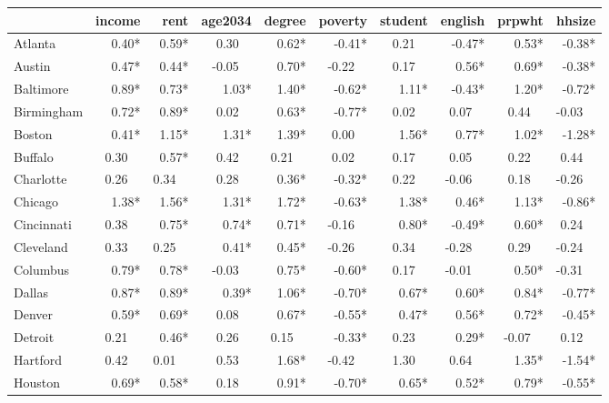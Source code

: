 \fontsize{9.5}{11.1}\selectfont
\begin{tabular}{lrrrrrrrrr}
	\toprule
	{}             &  income &    rent & age2034 &  degree & poverty & student & english &  prpwht &  hhsize \\ \midrule
	Atlanta        &   0.40* &   0.59* &  0.30~~ &   0.62* &  -0.41* &  0.21~~ &  -0.47* &   0.53* &  -0.38* \\
	Austin         &   0.47* &   0.44* & -0.05~~ &   0.70* & -0.22~~ &  0.17~~ &   0.56* &   0.69* &  -0.38* \\
	Baltimore      &   0.89* &   0.73* &   1.03* &   1.40* &  -0.62* &   1.11* &  -0.43* &   1.20* &  -0.72* \\
	Birmingham     &   0.72* &   0.89* &  0.02~~ &   0.63* &  -0.77* &  0.02~~ &  0.07~~ &  0.44~~ & -0.03~~ \\
	Boston         &   0.41* &   1.15* &   1.31* &   1.39* &  0.00~~ &   1.56* &   0.77* &   1.02* &  -1.28* \\
	Buffalo        &  0.30~~ &   0.57* &  0.42~~ &  0.21~~ &  0.02~~ &  0.17~~ &  0.05~~ &  0.22~~ &  0.44~~ \\
	Charlotte      &  0.26~~ &  0.34~~ &  0.28~~ &   0.36* &  -0.32* &  0.22~~ & -0.06~~ &  0.18~~ & -0.26~~ \\
	Chicago        &   1.38* &   1.56* &   1.31* &   1.72* &  -0.63* &   1.38* &   0.46* &   1.13* &  -0.86* \\
	Cincinnati     &  0.38~~ &   0.75* &   0.74* &   0.71* & -0.16~~ &   0.80* &  -0.49* &   0.60* &  0.24~~ \\
	Cleveland      &  0.33~~ &  0.25~~ &   0.41* &   0.45* & -0.26~~ &  0.34~~ & -0.28~~ &  0.29~~ & -0.24~~ \\
	Columbus       &   0.79* &   0.78* & -0.03~~ &   0.75* &  -0.60* &  0.17~~ & -0.01~~ &   0.50* & -0.31~~ \\
	Dallas         &   0.87* &   0.89* &   0.39* &   1.06* &  -0.70* &   0.67* &   0.60* &   0.84* &  -0.77* \\
	Denver         &   0.59* &   0.69* &  0.08~~ &   0.67* &  -0.55* &   0.47* &   0.56* &   0.72* &  -0.45* \\
	Detroit        &  0.21~~ &   0.46* &  0.26~~ &  0.15~~ &  -0.33* &  0.23~~ &   0.29* & -0.07~~ &  0.12~~ \\
	Hartford       &  0.42~~ &  0.01~~ &  0.53~~ &   1.68* & -0.42~~ &  1.30~~ &  0.64~~ &   1.35* &  -1.54* \\
	Houston        &   0.69* &   0.58* &  0.18~~ &   0.91* &  -0.70* &   0.65* &   0.52* &   0.79* &  -0.55* \\

\end{tabular}
